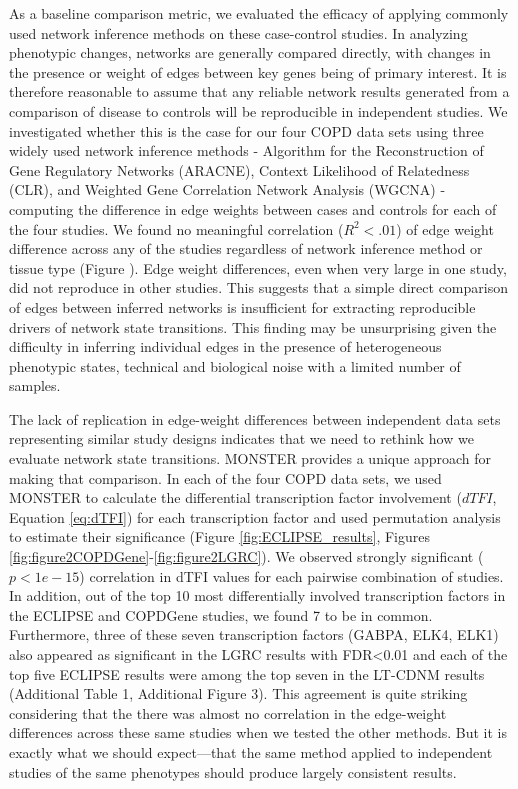 As a baseline comparison metric, we evaluated the efficacy of applying commonly used network inference methods on these case-control studies. In analyzing phenotypic changes, networks are generally compared directly, with changes in the presence or weight of edges between key genes being of primary interest. It is therefore reasonable to assume that any reliable network results generated from a comparison of disease to controls will be reproducible in independent studies. We investigated whether this is the case for our four COPD data sets using three widely used network inference methods - Algorithm for the Reconstruction of Gene Regulatory Networks (ARACNE)\cite{margolin2006aracne}, Context Likelihood of Relatedness (CLR)\cite{faith2007large}, and Weighted Gene Correlation Network Analysis (WGCNA) \cite{zhang2005general} - computing the difference in edge weights between cases and controls for each of the four studies. We found no meaningful correlation ($R^{2}<.01$) of edge weight difference across any of the studies regardless of network inference method or tissue type (Figure \label{fig:Supplement NI edgeweight plots}). Edge weight differences, even when very large in one study, did not reproduce in other studies. This suggests that a simple direct comparison of edges between inferred networks is insufficient for extracting reproducible drivers of network state transitions. This finding may be unsurprising given the difficulty in inferring individual edges in the presence of heterogeneous phenotypic states, technical and biological noise with a limited number of samples. 

The lack of replication in edge-weight differences between independent data sets representing similar study designs indicates that we need to rethink how we evaluate network state transitions. MONSTER provides a unique approach for making that comparison. In each of the four COPD data sets, we used MONSTER to calculate the differential transcription factor involvement ($dTFI$, Equation \ref{eq:dTFI}) for each transcription factor and used permutation analysis to estimate their significance (Figure \ref{fig:ECLIPSE_results}, Figures \ref{fig:figure2COPDGene}-\ref{fig:figure2LGRC}). We observed strongly significant ($p<1e-15$) correlation in dTFI values for each pairwise combination of studies. In addition, out of the top 10 most differentially involved transcription factors in the ECLIPSE and COPDGene studies, we found 7 to be in common. Furthermore, three of these seven transcription factors (GABPA, ELK4, ELK1) also appeared as significant in the LGRC results with FDR<0.01 and each of the top five ECLIPSE results were among the top seven in the LT-CDNM results (Additional Table 1, Additional Figure 3). This agreement is quite striking considering that the there was almost no correlation in the edge-weight differences across these same studies when we tested the other methods. But it is exactly what we should expect---that the same method applied to independent studies of the same phenotypes should produce largely consistent results.


